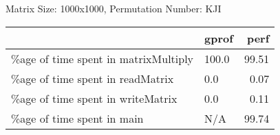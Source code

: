 \documentclass{article}
\begin{document}
    Matrix Size: 1000x1000, Permutation Number: KJI \\
    \begin{tabular}{llr}
\hline
                                      & gprof   &   perf \\
\hline
 \%age of time spent in matrixMultiply & 100.0   &  99.51 \\
 \%age of time spent in readMatrix     & 0.0     &   0.07 \\
 \%age of time spent in writeMatrix    & 0.0     &   0.11 \\
 \%age of time spent in main           & N/A     &  99.74 \\
\hline
\end{tabular}
    
\end{document}
